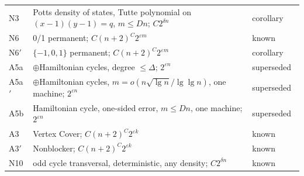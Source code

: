 \documentclass[11pt]{article}
\theoremstyle{remark}
\begin{document}
\begin{table}[t]
\begin{tabularx}{\textwidth}{@{}lXl@{}}
N3 & Potts density of states, Tutte polynomial on $(x-1)(y-1)=q$, $m\le Dn$; $C2^{\delta n}$ & corollary\\
N6 & 0/1 permanent; $C(n+2)^C2^{\varepsilon m}$ & known~\cite{openai}\\
N6$'$ & $\{-1,0,1\}$ permanent; $C(n+2)^C2^{\varepsilon m}$ & corollary\\
A5a & $\oplus$Hamiltonian cycles, degree $\le\Delta$; $2^{\varepsilon n}$ & superseded~\cite{Tul26}\\
A5a$'$ & $\oplus$Hamiltonian cycles, $m=o(n\sqrt{\lg n}/\lg\lg n)$, one machine; $2^{\varepsilon n}$ & superseded~\cite{Tul26}\\
A5b & Hamiltonian cycle, one-sided error, $m\le Dn$, one machine; $2^{\varepsilon n}$ & superseded~\cite{Tul26}\\
A3 & Vertex Cover; $C(n+2)^C2^{\varepsilon k}$ & known~\cite{IPZ01,CJ03}\\
A3$'$ & Nonblocker; $C(n+2)^C2^{\varepsilon k}$ & known~\cite{GdHKS16,DFFPR06}\\
N10 & odd cycle transversal, deterministic, any density; $C2^{\delta n}$ & known~\cite{IPZ01}\\
\bottomrule
\end{tabularx}
\end{table}
\end{document}
